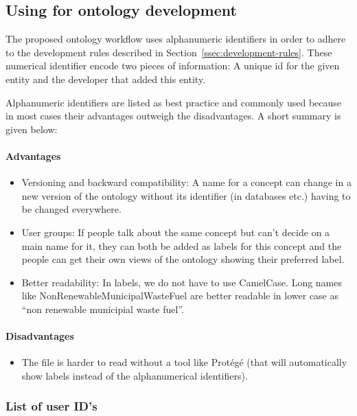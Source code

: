 \subsection{Using {\protege} for ontology development}

\label{ssec:using-protege}
The proposed ontology workflow uses alphanumeric identifiers in order to adhere to the development rules described in Section~\ref{ssec:development-rules}. These numerical identifier encode two pieces of information: A unique id for the given entity and the developer that added this entity.

Alphanumeric identifiers are listed as best
practice and commonly used because in most cases their advantages
outweigh the disadvantages. A short summary is given below:
\paragraph{Advantages} 
\begin{itemize}
    \item Versioning and backward compatibility: A name for a concept
    can change in a new version of the ontology without its identifier (in
    databases etc.) having to be changed everywhere. 
    \item User groups: If people
    talk about the same concept but can't decide on a main name for it, they
    can both be added as labels for this concept and the people can get
    their own views of the ontology showing their preferred label. 
    \item Better readability: In labels, we do not have to use CamelCase. Long names like NonRenewableMunicipalWasteFuel are better readable in lower case as ``non renewable municipial waste fuel''.
\end{itemize}


\hypertarget{disadvantages}{%
\paragraph{Disadvantages}\label{disadvantages}}

\begin{itemize}
\item
  The file is harder to read without a tool like Prot\'eg\'e (that will
  automatically show labels instead of the alphanumerical identifiers).
\end{itemize}


\subsubsection{List of user ID's}
\label{ssec:list-of-user-ids}

